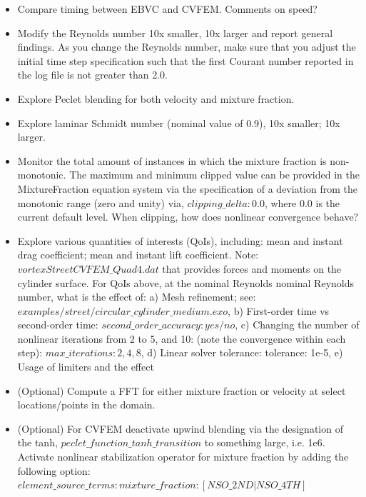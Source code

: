\documentclass{article}
\begin{document}
\begin{itemize}
	\item Compare timing between EBVC and CVFEM. Comments on speed?
        \item Modify the Reynolds number 10x smaller, 10x larger and report general findings. 
          As you change the Reynolds number, make sure that you adjust the initial time step 
          specification such that the first Courant number reported in the log file is not greater 
          than 2.0.
        \item Explore Peclet blending for both velocity and mixture fraction.
        \item Explore laminar Schmidt number (nominal value of 0.9), 10x smaller; 10x larger.
        \item Monitor the total amount of instances in which the mixture fraction is non-monotonic.
          \subitem The maximum and minimum clipped value can be provided in the MixtureFraction
          equation system via the specification of a deviation from the monotonic range (zero and unity)
          via, $clipping\_delta: 0.0$, where $0.0$ is the current default level. When clipping, how does nonlinear 
          convergence behave?
        \item Explore various quantities of interests (QoIs), including: mean and instant drag 
          coefficient; mean and instant lift coefficient. 
        \subitem Note: $vortexStreetCVFEM\_Quad4.dat$ 
          that provides forces and moments on the cylinder surface. For QoIs above, at the nominal 
          Reynolds nominal Reynolds number, what is the effect of: a) Mesh refinement; see: 
          $examples/street/circular\_cylinder\_medium.exo$, b) First-order time vs second-order time: 
          $second\_order\_accuracy: yes/no$, c) Changing the number of nonlinear iterations from 2 to 5, 
          and 10: (note the convergence within each step): $max\_iterations: 2, 4, 8$, d) Linear solver 
          tolerance: tolerance: 1e-5, e) Usage of limiters and the effect
        \item (Optional) Compute a FFT for either mixture fraction or velocity at select locations/points in the domain. 
        \item (Optional) For CVFEM deactivate upwind blending via the designation of the tanh, 
          $peclet\_function\_tanh\_transition$ to something large, i.e. 1e6. 
          Activate nonlinear stabilization operator for mixture fraction by adding the following option: 
        \subitem $element\_source\_terms: mixture\_fraction: [NSO\_2ND|NSO\_4TH]$

\end{itemize}
\end{document}
